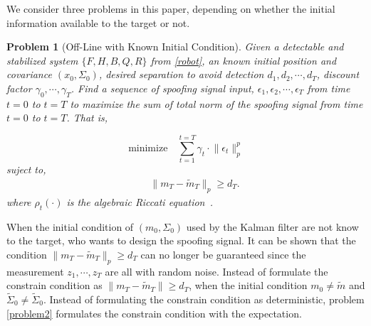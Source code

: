 \documentclass[letterpaper, 10 pt, conference]{ieeeconf}  %
\newcommand{\pcomment}{\textcolor{blue}}%
\newtheorem{problem}{Problem}
\begin{document}
We consider three problems in this paper, depending on whether the initial information available to the target or not.

\begin{problem} [Off-Line with Known Initial Condition] \label{problem1}
Given a detectable and stabilized system $\{F, H, B, Q, R \}$ from \eqref{robot}, an known initial position and covariance $(x_0, \Sigma_0)$, desired separation to avoid detection $d_1,d_2,\cdots,d_T$, discount factor $\gamma_0,\cdots,\gamma_T$. Find a sequence of spoofing signal input, $\epsilon_1, \epsilon_2,\cdots,  \epsilon_{T} $ from time $t=0$ to $t=T$ to maximize the sum of total norm of the spoofing signal from time $t=0$ to $t=T$. That is, 

\begin{equation}
  \label{eq5}
 \text{minimize}  \quad \sum^{t=T}_{t=1} \gamma_t \cdot \lVert \epsilon_t\lVert_p^p
\end{equation}
suject to,
\begin{equation} \label{problem1st}
\begin{split}
&\quad \lVert m_T - \tilde{m}_T\lVert_p \ge d_T.
     \end{split}
\end{equation}
where $\rho_{t}(\cdot)$ is the algebraic Riccati equation~\cite{kumar1986stochastic}. 
\end{problem}

When the initial condition of $(m_0,\Sigma_0)$ used by the Kalman filter are not know to the target, who wants to design the spoofing signal. It can be shown that the condition $\lVert m_T - \tilde{m}_T\lVert_p  \ge d_T$ can no longer be guaranteed since the measurement $z_1,\cdots,z_T$ are all with random noise. Instead of formulate the constrain condition as $\lVert m_T - \tilde{m}_T\lVert  \ge d_T$, when the initial condition $m_0 \neq \tilde{m}$ and $\tilde{\Sigma}_0 \neq \tilde{\Sigma}_0$. Instead of formulating the constrain condition  as  deterministic, problem  \ref{problem2} formulates the constrain condition with the expectation.
\end{document}
